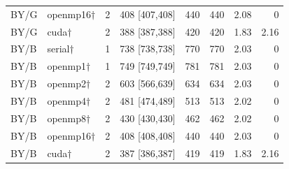 \documentclass[11pt]{article}
\begin{document}
\begin{longtable}{llrrrrrr}
BY/G & openmp16$\dagger$ & 2 & 408 [407,408] & 440 & 440 & 2.08 & 0\\
BY/G & cuda$\dagger$ & 2 & 388 [387,388] & 420 & 420 & 1.83 & 2.16\\
BY/B & serial$\dagger$ & 1 & 738 [738,738] & 770 & 770 & 2.03 & 0\\
BY/B & openmp1$\dagger$ & 1 & 749 [749,749] & 781 & 781 & 2.03 & 0\\
BY/B & openmp2$\dagger$ & 2 & 603 [566,639] & 634 & 634 & 2.03 & 0\\
BY/B & openmp4$\dagger$ & 2 & 481 [474,489] & 513 & 513 & 2.02 & 0\\
BY/B & openmp8$\dagger$ & 2 & 430 [430,430] & 462 & 462 & 2.02 & 0\\
BY/B & openmp16$\dagger$ & 2 & 408 [408,408] & 440 & 440 & 2.03 & 0\\
BY/B & cuda$\dagger$ & 2 & 387 [386,387] & 419 & 419 & 1.83 & 2.16\\
\bottomrule\end{longtable}\normalsize
\end{document}
